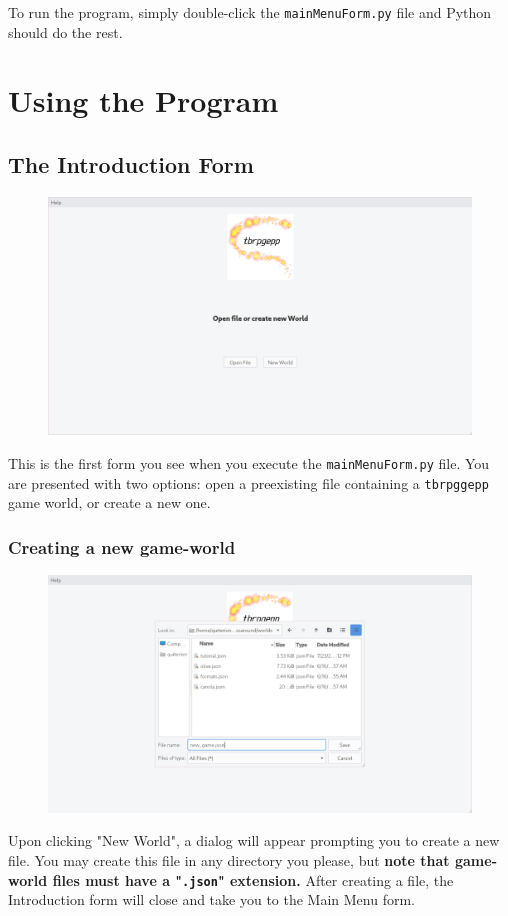 \documentclass{article} \usepackage[margin=1in,headheight=57pt,headsep=0.1in]{geometry}
\begin{document}
To run the program, simply double-click the \texttt{mainMenuForm.py} file and Python should do the rest.
\newpage
\section{Using the Program}
\subsection{The Introduction Form}
\begin{figure}[H]
	\centering
	\includegraphics[width=1.0\textwidth]{./introForm.png}
\end{figure}
This is the first form you see when you execute the \texttt{mainMenuForm.py} file. You are presented with two options: open a preexisting file containing a \texttt{tbrpggepp} game world, or create a new one.
\subsubsection{Creating a new game-world}
\begin{figure}[H]
	\centering
	\includegraphics[width=1.0\textwidth]{./introFormWithFileDialog.png}
\end{figure}
Upon clicking "New World", a dialog will appear prompting you to create a new file. You may create this file in any directory you please, but \textbf{note that game-world files must have a "\texttt{.json}" extension.} After creating a file, the Introduction form will close and take you to the Main Menu form.
\end{document}
